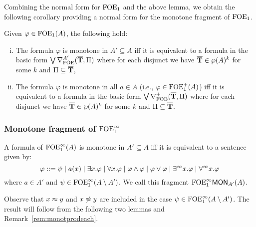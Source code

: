 Combining the normal form for $\ofoe$ and the above lemma, we obtain the following corollary providing a normal form for the monotone fragment of $\ofoe$.

\begin{corollary}\label{cor:ofoepositivenf}
	Given $\varphi \in \ofoe(A)$, the following hold:
	\begin{enumerate}[(i)]
		\item The formula $\varphi$ is monotone in $A'\subseteq A$ iff it is equivalent to a formula in the basic form $\bigvee \mondbnfofoe{\vlist{T}}{\Pi}{A'}$
		where
		for each disjunct we have $\vlist{T} \in \wp(A)^k$ for some $k$ and $\Pi\subseteq\vlist{T}$,
		\item The formula $\varphi$ is monotone in all $a\in A$ (i.e., $\varphi\in \ofoe^+(A)$) iff it is equivalent to a formula in the basic form $\bigvee \posdbnfofoe{\vlist{T}}{\Pi}$
		where
		for each disjunct we have $\vlist{T} \in \wp(A)^k$ for some $k$ and $\Pi\subseteq\vlist{T}$.
	\end{enumerate}
\end{corollary}

\subsubsection{Monotone fragment of $\ofoei$}

\begin{theorem}\label{thm:ofoeimonot}
A formula of $\ofoei(A)$ is monotone in ${A' \subseteq A}$ iff it is equivalent to a sentence given by:
\[
\varphi ::= \psi \mid a(x) \mid \exists x.\varphi \mid \forall x.\varphi \mid \varphi \land \varphi \mid \varphi \lor \varphi \mid \qu x.\varphi \mid \dqu x.\varphi
\]
where $a\in A'$ and $\psi \in \ofoei(A\setminus A')$. We call this fragment $\monot{\ofoei}{A'}(A)$.
\end{theorem}

Observe that $x \foeq y$ and $x \not\foeq y$ are included in the case $\psi \in \ofoei(A\setminus A')$. The result will follow from the following two lemmas and Remark~\ref{rem:monotprodeach}.

